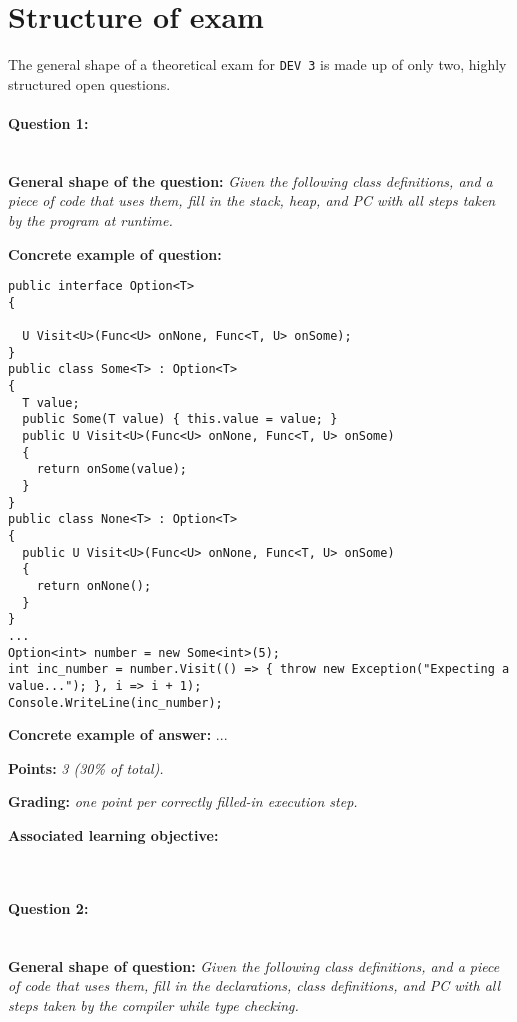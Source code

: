 \section*{Structure of exam \modulecode}
The general shape of a theoretical exam for \texttt{DEV 3} is made up of only two, highly structured open questions.

\paragraph{Question 1: } \ \\

\textbf{General shape of the question:} \textit{Given the following class definitions, and a piece of code that uses them, fill in the stack, heap, and PC with all steps taken by the program at runtime.}

\textbf{Concrete example of question:}

\lstset{numbers=left,basicstyle=\ttfamily\small}\lstset{language=[Sharp]C}
\begin{lstlisting}
public interface Option<T>
{

  U Visit<U>(Func<U> onNone, Func<T, U> onSome);
}
public class Some<T> : Option<T>
{
  T value;
  public Some(T value) { this.value = value; }
  public U Visit<U>(Func<U> onNone, Func<T, U> onSome)
  {
    return onSome(value);
  }
}
public class None<T> : Option<T>
{
  public U Visit<U>(Func<U> onNone, Func<T, U> onSome)
  {
    return onNone();
  }
}
...
Option<int> number = new Some<int>(5);
int inc_number = number.Visit(() => { throw new Exception("Expecting a value..."); }, i => i + 1);
Console.WriteLine(inc_number);
\end{lstlisting}

\textbf{Concrete example of answer:}
...

\textbf{Points:} \textit{3 (30\% of total).}

\textbf{Grading:} \textit{one point per correctly filled-in execution step.}

\textbf{Associated learning objective:} 

\ \\ 

\paragraph{Question 2: } \ \\

\textbf{General shape of question:} \textit{Given the following class definitions, and a piece of code that uses them, fill in the declarations, class definitions, and PC with all steps taken by the compiler while type checking.}

